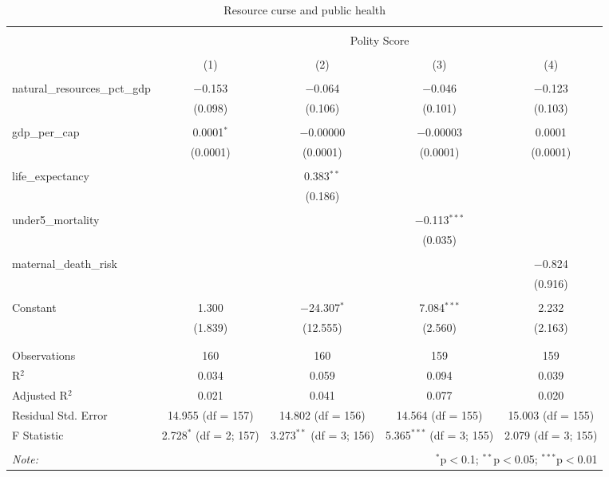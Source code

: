 
\begin{table}[!htbp] \centering
  \caption{Resource curse and public health}
  \label{}
\begin{tabular}{@{\extracolsep{5pt}}lcccc}
\\[-1.8ex]\hline
\hline \\[-1.8ex]
 & \multicolumn{4}{c}{Polity Score} \\
\cline{2-5}
\\[-1.8ex] & (1) & (2) & (3) & (4)\\ 
\hline \\[-1.8ex]
 natural\_resources\_pct\_gdp & $-$0.153 & $-$0.064 & $-$0.046 & $-$0.123 \\
  & (0.098) & (0.106) & (0.101) & (0.103) \\
  & & & & \\
 gdp\_per\_cap & 0.0001$^{*}$ & $-$0.00000 & $-$0.00003 & 0.0001 \\
  & (0.0001) & (0.0001) & (0.0001) & (0.0001) \\
  & & & & \\
 life\_expectancy &  & 0.383$^{**}$ &  &  \\
  &  & (0.186) &  &  \\
  & & & & \\
 under5\_mortality &  &  & $-$0.113$^{***}$ &  \\
  &  &  & (0.035) &  \\
  & & & & \\
 maternal\_death\_risk &  &  &  & $-$0.824 \\
  &  &  &  & (0.916) \\
  & & & & \\
 Constant & 1.300 & $-$24.307$^{*}$ & 7.084$^{***}$ & 2.232 \\
  & (1.839) & (12.555) & (2.560) & (2.163) \\
  & & & & \\
\hline \\[-1.8ex]
Observations & 160 & 160 & 159 & 159 \\
R$^{2}$ & 0.034 & 0.059 & 0.094 & 0.039 \\
Adjusted R$^{2}$ & 0.021 & 0.041 & 0.077 & 0.020 \\
Residual Std. Error & 14.955 (df = 157) & 14.802 (df = 156) & 14.564 (df = 155) & 15.003 (df = 155) \\
F Statistic & 2.728$^{*}$ (df = 2; 157) & 3.273$^{**}$ (df = 3; 156) & 5.365$^{***}$ (df = 3; 155) & 2.079 (df = 3; 155) \\
\hline
\hline \\[-1.8ex]
\textit{Note:}  & \multicolumn{4}{r}{$^{*}$p$<$0.1; $^{**}$p$<$0.05; $^{***}$p$<$0.01} \\
\end{tabular}
\end{table}
